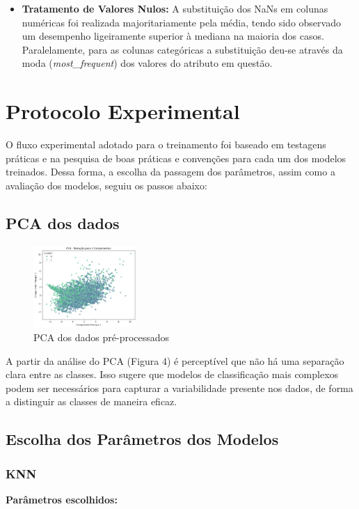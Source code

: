 \documentclass[conference]{IEEEtran}
\begin{document}
\begin{itemize}
    \item \textbf{Tratamento de Valores Nulos:} A substituição dos NaNs em colunas numéricas foi realizada majoritariamente pela média, tendo sido observado um desempenho ligeiramente superior à mediana na maioria dos casos. Paralelamente, para as colunas categóricas a substituição deu-se através da moda (\emph{most\_frequent}) dos valores do atributo em questão.
\end{itemize}


\section{Protocolo Experimental}
O fluxo experimental adotado para o treinamento foi baseado em testagens práticas e na pesquisa de boas práticas e convenções para cada um dos modelos treinados. Dessa forma, a escolha da passagem dos parâmetros, assim como a avaliação dos modelos, seguiu os passos abaixo:

\subsection{PCA dos dados}

\begin{figure}[ht]
    \centering
    \includegraphics[width=0.35\textwidth]{pca.png}
    \caption{PCA dos dados pré-processados}
    \label{fig:pca}
\end{figure}

A partir da análise do PCA (Figura 4) é perceptível que não há uma separação clara entre as classes. Isso sugere que modelos de classificação mais complexos podem ser necessários para capturar a variabilidade presente nos dados, de forma a distinguir as classes de maneira eficaz.

\subsection{Escolha dos Parâmetros dos Modelos}

\subsubsection{KNN}
\textbf{Parâmetros escolhidos:}
\end{document}
